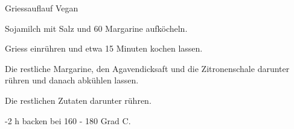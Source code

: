
\begin{recipe}[]{Griessauflauf Vegan}{}{}



\step
Sojamilch mit Salz und 60 \g Margarine aufk\"ocheln.

\step
Griess einr\"uhren und etwa 15 Minuten kochen lassen.

\step
Die restliche Margarine, den Agavendicksaft und die Zitronenschale darunter r\"uhren und danach abk\"uhlen lassen.

\step
Die restlichen Zutaten darunter r\"uhren.

-2 h backen bei 160 - 180 Grad C.

\end{recipe}

